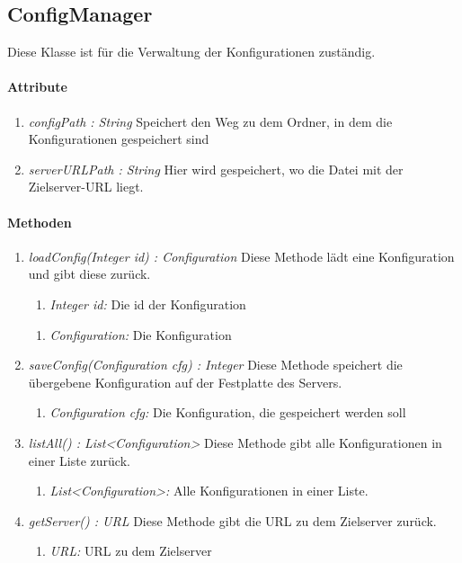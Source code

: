 
\subsection{ConfigManager}
Diese Klasse ist für die Verwaltung der Konfigurationen zuständig.
\paragraph{Attribute}
\begin{enumerate}[-]
	\item \textit{configPath : String} Speichert den Weg zu dem Ordner, in dem die Konfigurationen gespeichert sind
	
	\item \textit{serverURLPath : String} Hier wird gespeichert, wo die Datei mit der Zielserver-URL liegt.		
\end{enumerate}

\paragraph{Methoden}
	
	\begin{enumerate}[+]
	\item \textit{loadConfig(Integer id) : Configuration} Diese Methode lädt eine Konfiguration und gibt diese zurück.
		\begin{enumerate}[$\bullet$]
			\item \textit{Integer id:} Die id der Konfiguration
		\end{enumerate}
		\vspace{-0.2cm}
		\begin{enumerate}[$\circ$]
			\item \textit{Configuration:} Die Konfiguration
		\end{enumerate}
	
	\item \textit{saveConfig(Configuration cfg) : Integer} Diese Methode speichert die übergebene Konfiguration auf der Festplatte des Servers.
	
	\begin{enumerate}[$\bullet$]
		\item \textit{Configuration cfg:} Die Konfiguration, die gespeichert werden soll
	\end{enumerate}
	
	\item \textit{listAll() : List<Configuration>} Diese Methode gibt alle Konfigurationen in einer Liste zurück.
	
	\begin{enumerate}[$\circ$]
		\item \textit{List<Configuration>:} Alle Konfigurationen in einer Liste.
	\end{enumerate}
	
	\item \textit{getServer() : URL} Diese Methode gibt die URL zu dem Zielserver zurück.
	
	\begin{enumerate}[$\circ$]
		\item \textit{URL:} URL zu dem Zielserver
	\end{enumerate}
\end{enumerate}